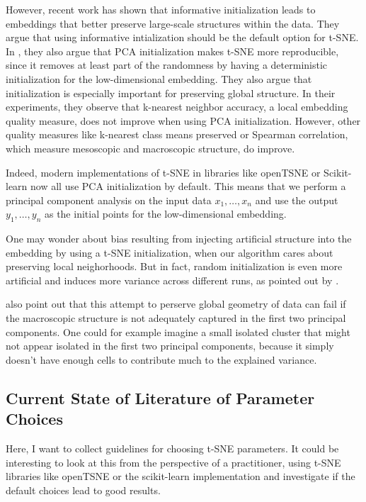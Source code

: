 However, recent work \cite{kobak21} has shown that informative initialization leads to embeddings that better preserve large-scale structures within the data. 
They argue that using informative intialization should be the default option for t-SNE.
In \cite{KoBe19SingleCell}, they also argue that PCA initialization makes t-SNE more reproducible, since it removes at least part of the randomness by having a deterministic initialization for the low-dimensional embedding. 
They also argue that initialization is especially important for preserving global structure. 
In their experiments, they observe that k-nearest neighbor accuracy, a local embedding quality measure, does not improve when using PCA initialization. 
However, other quality measures like k-nearest class means preserved or Spearman correlation, which measure mesoscopic and macroscopic structure, do improve. 

Indeed, modern implementations of t-SNE in libraries like openTSNE \cite{openTSNE} or Scikit-learn now all use PCA initialization by default. 
This means that we perform a principal component analysis on the input data $x_1, \dots, x_n$ and use the output $y_1, \dots, y_n$ as the initial points for the low-dimensional embedding. 

One may wonder about bias resulting from injecting artificial structure into the embedding by using a t-SNE initialization, when our algorithm cares about preserving local neighorhoods. But in fact, random initialization is even more artificial and induces more variance across different runs, as pointed out by \cite{KoBe19SingleCell}. 

\cite{KoBe19SingleCell} also point out that this attempt to perserve global geometry of data can fail if the macroscopic structure is not adequately captured in the first two principal components. 
One could for example imagine a small isolated cluster that might not appear isolated in the first two principal components, because it simply doesn't have enough cells to contribute much to the explained variance. 


\subsection{Current State of Literature of Parameter Choices}
Here, I want to collect guidelines for choosing t-SNE parameters. It could be interesting to look at this from the perspective of a practitioner, using t-SNE libraries like openTSNE or the scikit-learn implementation and investigate if the default choices lead to good results. 



